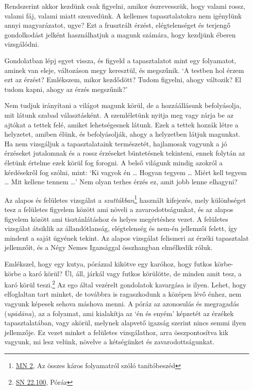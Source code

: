 
Rendszerint akkor kezdünk csak figyelni, amikor észrevesszük, hogy
valami rossz, valami fáj, valami miatt szenvedünk. A kellemes
tapasztalatokra nem igénylünk annyi magyarázatot, ugye? Ezt a frusztrált
érzést, elégtelenséget és terjengő gondolkodást jelként használhatjuk a
magunk számára, hogy kezdjünk éberen vizsgálódni.

Gondolatban lépj egyet vissza, és figyeld a tapasztalatot mint egy
folyamatot, aminek van eleje, változáson megy keresztül, és megszűnik.
`A testben hol érzem ezt az érzést? Emlékszem, mikor kezdődött? Tudom
figyelni, ahogy változik? El tudom kapni, ahogy az érzés megszűnik?'

Nem tudjuk irányítani a világot magunk körül, de a hozzáállásunk
befolyásolja, mit látunk szabad választásként. A szemléletünk nyitja meg
vagy zárja be az ajtókat a tettek felé, amiket lehetségesnek látunk.
Ezek a tettek hozzák létre a helyzetet, amiben élünk, és befolyásolják,
ahogy a helyzetben látjuk magunkat. Ha nem vizsgáljuk a tapasztalataink
természetét, hajlamosak vagyunk a jó érzéseket jutalomnak és a rossz
érzéseket büntetésnek tekinteni, ennek folytán az életünk értelme ezek
körül fog forogni. A belső világunk mindig azokról a kérdésekről fog
szólni, mint: `Ki vagyok én \ldots{} Hogyan tegyem \ldots{} Miért kell
tegyem \ldots{} Mit kellene tennem \ldots{}' Nem olyan terhes érzés ez,
amit jobb lenne elhagyni?

Az alapos és felületes vizsgálat a \emph{szuttákban}\footnote{\href{https://a-buddha-ujja.hu/mn-2/hu/forizs-laszlo}{MN
  2}, Az összes káros folyamatról szóló tanítóbeszéd} használt
kifejezés, mely különbséget tesz a felületes figyelem között ami növeli
a zavarodottságunkat, és az alapos figyelem között ami tisztánlátáshoz
és helyes megértéshez vezet. A felületes vizsgálat átsiklik az
állandótlanság, elégtelenség és nem-én jellemzői felett, így mindent a
saját ügyének tekint. Az alapos vizsgálat felismeri az érzéki
tapasztalat jellemzőit, és a Négy Nemes Igazsággal összhangban
elmélkedik róluk.


Emlékszel, hogy egy kutya, pórázzal kikötve egy karóhoz, hogy futkos
körbe-körbe a karó körül? Ül, áll, járkál vagy futkos körülötte, de
minden amit tesz, a karó körül teszi.\footnote{\href{https://suttacentral.net/sn22.100}{SN
  22.100}, Póráz} Az ego által vezérelt gondolatok kavargása is ilyen.
Lehet, hogy elfoglaltan tart minket, de továbbra is ragaszkodunk a
középen lévő énhez, nem vagyunk képesek sehova máshova menni. A póráz az
azonosulás és megragadás (\emph{upādāna}), az a folyamat, ami kialakítja
az `én és enyém' képzetét az érzékek tapasztalatában, vagy akörül,
melynek alapvető igazság szerint nincs semmi ilyen jellemzője. Ez vezet
minket a felületes vizsgálathoz, arra összpontosítva kik vagyunk, mi
lesz velünk, növelve a kétségünket és zavarodottságunkat.

